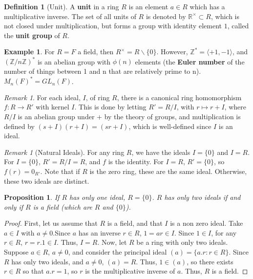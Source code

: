 \documentclass[12pt]{article}
\newtheorem{prop}[thm]{Proposition}
\theoremstyle{definition}
\newtheorem{defn}[thm]{Definition}
\newtheorem{eg}[thm]{Example}
\theoremstyle{remark}
\newtheorem{rmk}[thm]{Remark}
\numberwithin{equation}{section}
\newcommand\R{\mathbb R}    %
\newcommand\Z{\mathbb Z}    %
\newcommand\B[1]{\textbf{ #1}}
\begin{document}
\vspace{15pt}

\begin{defn}[Unit]
        A \B{unit} in a ring $R$ is an element $a\in R$ which has a multiplicative inverse. The set of all units of $R$ is denoted by $\R^{\times} \subset R$, which is not closed under multiplication, but forms a group with identity element $1$, called the \B{unit group} of $R$.
\end{defn}

\vspace{15pt}


\begin{eg}
        For $R = F$ a field, then $R^{\times} = R\backslash\{0\}$. However, $\Z^* = \langle +1, -1 \rangle$, and $(\Z/n\Z)^*$ is an abelian group with $\phi(n)$ elements (the \B{Euler number} of the number of things between 1 and n that are relatively prime to n). $M_n(F)^* = GL_n(F)$.
\end{eg}

\vspace{15pt}


\begin{rmk}
        For each ideal, $I$, of ring $R$, there is a canonical ring homomorphism $f:R\rightarrow R'$ with kernel $I$. This is done by letting $R' = R/I$, with $r\mapsto r+I$, where $R/I$ is an abelian group under $+$ by the theory of groups, and multiplication is defined by $(s+I)(r+I) = (sr+I)$, which is well-defined since $I$ is an ideal.
\end{rmk}

\vspace{15pt}

\begin{rmk}[Natural Ideals] 
        For any ring $R$, we have the ideals $I = \{0\}$ and $I = R$. For $I = \{0\}$, $R' = R/I = R$, and $f$ is the identity. For $I = R$, $R' = \{0\}$, so $f(r) = 0_{R'}$. Note that if $R$ is the zero ring, these are the same ideal. Otherwise, these two ideals are distinct. 
\end{rmk}


\vspace{15pt}

\begin{prop}
        If $R$ has only one ideal, $R =\{0\}$. $R$ has only two ideals if and only if $R$ is a field (which are $R$ and $\{0\}$).
\end{prop}
\begin{proof}
        First, let us assume that $R$ is a field, and that $I$ is a non zero ideal. Take $a \in I$ with $a \neq 0$.Since $a$ has an inverse $r \in R$, $1 = ar \in I$. Since $1 \in I$, for any $r \in R$, $r = r.1 \in I$. Thus, $I = R$. Now, let $R$ be a ring with only two ideals. Suppose $a \in R$, $a \neq 0$, and consider the principal ideal $(a) = \{a.r:r\in R\}$. Since $R$ has only two ideals, and $a \neq 0$, $(a) = R$. Thus, $1 \in (a)$, so there exists $r \in R$ so that $a.r = 1$, so $r$ is the multiplicative inverse of $a$. Thus, $R$ is a field.
\end{proof}
\end{document}
